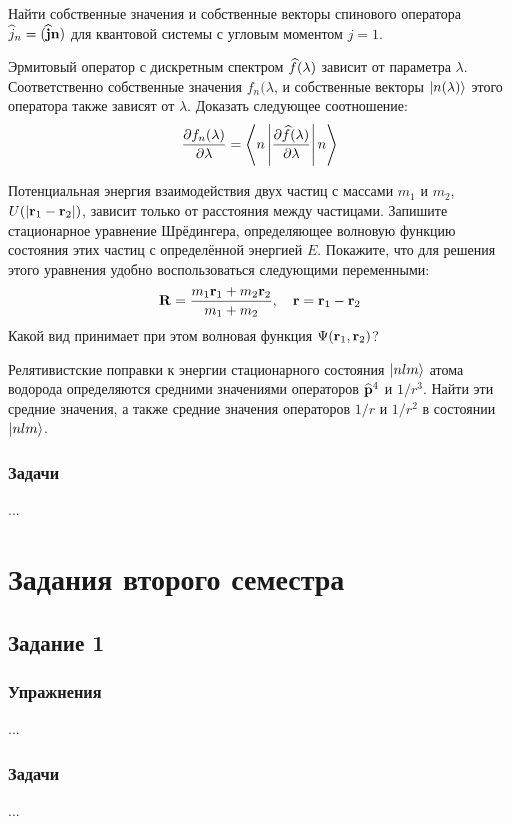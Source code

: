 \begin{exercise}
%
\item\label{ex:1_2_9}%
Найти собственные значения и собственные векторы спинового оператора $\widehat{j}_n = (\widehat{\mathbf{j}}\mathbf{n})$ для квантовой системы с угловым моментом $j=1$.
%
\item\label{ex:1_2_10}%
Эрмитовый оператор с дискретным спектром $\widehat{f}(\lambda)$ зависит от параметра $\lambda$. Соответственно собственные значения $f_n(\lambda$, и собственные векторы $\left|{n(\lambda)}\right\rangle$ этого оператора также зависят от $\lambda$. Доказать следующее соотношение:
$$
\frac{\partial{f_n(\lambda)}}{\partial{\lambda}} =
  \left\langle{n}\left|{\frac{\partial{\widehat{f}(\lambda)}}{\partial{\lambda}}}\right|{n}\right\rangle
$$
%
\item\label{ex:1_2_11}%
Потенциальная энергия взаимодействия двух частиц с массами $m_1$ и $m_2$, $U(\left\lvert{\mathbf{r}_1 - \mathbf{r}_2}\right\rvert)$, зависит только от расстояния между частицами. Запишите стационарное уравнение Шрёдингера, определяющее волновую функцию состояния этих частиц с определённой энергией $E$. Покажите, что для решения этого уравнения удобно воспользоваться следующими переменными:
$$
\mathbf{R} = \frac{m_1 \mathbf{r}_1 + m_2 \mathbf{r}_2}{m_1 + m_2},~~~
\mathbf{r} = \mathbf{r}_1 - \mathbf{r}_2
$$%
%
Какой вид принимает при этом волновая функция $\Psi(\mathbf{r}_1, \mathbf{r}_2)$?
%
\item\label{ex:1_2_12}%
Релятивистские поправки к энергии стационарного состояния $\left|{nlm}\right\rangle$ атома водорода определяются средними значениями операторов $\widehat{\mathbf{p}}^4$ и $1/r^3$. Найти эти средние значения, а также средние значения операторов $1/r$ и $1/r^2$ в состоянии $\left|{nlm}\right\rangle$.
\end{exercise}

\subsection*{\hfil Задачи \hfil}
%
\begin{problem}
\item ...
\end{problem}



\chapter{Задания второго семестра}

\section{Задание 1}

\subsection*{\hfil Упражнения \hfil}
%
\begin{exercise}
\item ...
\end{exercise}

\subsection*{\hfil Задачи \hfil}
%
\begin{problem}
\item ...
\end{problem}

